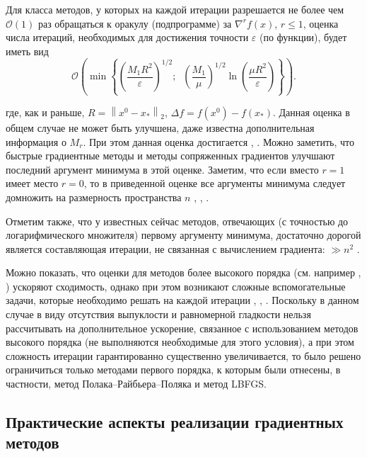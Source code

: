   Для класса методов, у которых на каждой итерации разрешается не более чем $\mathcal{O}\left( 1 \right)$ раз обращаться к оракулу (подпрограмме) за $\nabla ^rf\left( x \right)$, $r\le 1$, оценка числа итераций, необходимых для достижения точности $\varepsilon $ (по функции), будет иметь вид
  \[
    \mathcal{O}\left( {\min \left\{ {\left( {\frac{M_1 
    R^2}{\varepsilon }} \right)^{1/2};\;\;\left( {\frac{M_1 }{\mu }} \right)^{1/2}\ln \left( {\frac{\mu R^2}{\varepsilon }} 
    \right)} \right\}} \right).
  \]

  где, как и раньше, $R=\left\| {x^0-x_\ast } \right\|_2 $, $\Delta f=f\left( {x^0} \right)-f\left( {x_\ast } \right)$. Данная оценка в общем случае не может быть улучшена, даже известна дополнительная информация о $M_r$. \cite{Nemirovski1979} При этом данная оценка достигается \cite{nesterov2013introductory}, \cite{Nemirovski1979}.  Можно заметить, что быстрые градиентные методы и методы сопряженных градиентов улучшают последний аргумент минимума в этой оценке. Заметим, что если вместо $r=1$ имеет место $r=0$, то в приведенной оценке все аргументы минимума следует домножить на размерность пространства $n$ \cite{bayandina2017gradient}, \cite{dvurechensky2018accelerated}, \cite{Protasov1996}.

  Отметим также, что у известных сейчас методов, отвечающих (с точностью до логарифмического множителя) первому аргументу минимума, достаточно дорогой является составляющая итерации, не связанная с вычислением градиента: $\gg n^2$ \cite{lee2015faster}.

  Можно показать, что оценки для методов более высокого порядка (см. например \cite{nesterov2018implementable}, \cite{arjevani2017oracle}) ускоряют сходимость, однако при этом возникают сложные вспомогательные задачи, которые необходимо решать на каждой итерации \cite{gasnikov2018global}, \cite{nesterov2018implementable}, \cite{monteiro2013accelerated}. Поскольку в данном случае в виду отсутствия выпуклости и равномерной гладкости нельзя рассчитывать на дополнительное ускорение, связанное с использованием методов высокого порядка (не выполняются необходимые для этого условия), а при этом сложность итерации гарантированно существенно увеличивается, то было решено ограничиться только методами первого порядка, к которым были отнесены, в частности, метод Полака--Райбьера--Поляка и метод LBFGS.


\subsection{Практические аспекты реализации градиентных методов}\label{pract}

